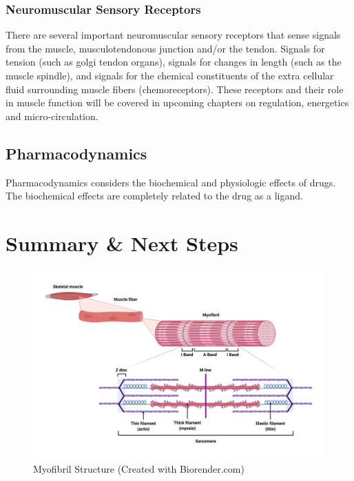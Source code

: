 \subsubsection{Neuromuscular Sensory Receptors} 
There are several important neuromuscular sensory receptors that sense signals from the muscle, musculotendonous junction and/or the tendon. Signals for tension (such as golgi tendon organs), signals for changes in length (such as the muscle spindle), and signals for the chemical constituents of the extra cellular fluid surrounding muscle fibers (chemoreceptors). These receptors and their role in muscle function will be covered in upcoming chapters on regulation, energetics and micro-circulation.

\subsection{Pharmacodynamics}

Pharmacodynamics considers the biochemical and physiologic effects of drugs. The biochemical effects are completely related to the drug as a ligand. 

\section{Summary \& Next Steps}



\begin{figure}[!ht]
    \centering
    \includegraphics[width=1\linewidth]{./figure/Myofibril_Structure.png}
    \caption{Myofibril Structure \footnotesize{(Created with Biorender.com)}}
    \label{fig:Myofibril_Structure}
\end{figure}


